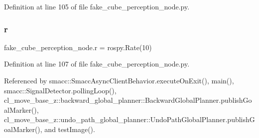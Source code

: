 Definition at line 105 of file fake\+\_\+cube\+\_\+perception\+\_\+node.\+py.

\mbox{\label{namespacefake__cube__perception__node_a36e88703ab69fd35065e8a8d9344903e}} 
\subsubsection{\texorpdfstring{r}{r}}
{\footnotesize\ttfamily fake\+\_\+cube\+\_\+perception\+\_\+node.\+r = rospy.\+Rate(10)}



Definition at line 107 of file fake\+\_\+cube\+\_\+perception\+\_\+node.\+py.



Referenced by smacc\+::\+Smacc\+Async\+Client\+Behavior.\+execute\+On\+Exit(), main(), smacc\+::\+Signal\+Detector.\+polling\+Loop(), cl\+\_\+move\+\_\+base\+\_\+z\+::backward\+\_\+global\+\_\+planner\+::\+Backward\+Global\+Planner.\+publish\+Goal\+Marker(), cl\+\_\+move\+\_\+base\+\_\+z\+::undo\+\_\+path\+\_\+global\+\_\+planner\+::\+Undo\+Path\+Global\+Planner.\+publish\+Goal\+Marker(), and test\+Image().

